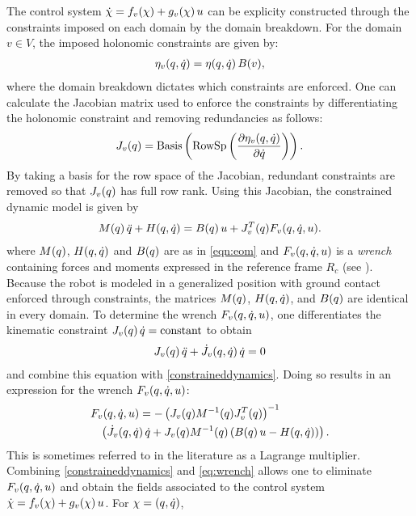 The control system ${\dot {\chi}} = f_v(\chi) + g_v(\chi) \, u$ can be explicity constructed through the constraints imposed on each domain by the domain breakdown.
%
For the domain $v \in V$, the imposed holonomic constraints are given by:
%
\begin{align}
  \eta_{v}(q, \dot{q}) = \eta(q, \dot{q}) \, B(v),
\end{align}
%
where the domain breakdown dictates which constraints are enforced.
%
One can calculate the Jacobian matrix used to enforce the constraints by differentiating the holonomic constraint and removing redundancies as follows:
%
\begin{align}
  J_{v}(q) = \mathrm{Basis}\left( \mathrm{RowSp}\left( \frac{\partial{\eta_{v}(q, \dot{q})}}{\partial{{\dot{q}}}} \right) \right).
\end{align}
%
By taking a basis for the row space of the Jacobian, redundant constraints are removed so that $J_v(q)$ has full row rank.
%
Using this Jacobian, the constrained dynamic model is given by
%
\begin{align}
  \label{constraineddynamics}
  M(q) \, \ddot{q} + H(q, \dot{q}) = B(q) \, u + J_v^T(q) F_v(q, \dot{q}, u).
\end{align}
%
where $M(q)$, $H(q, \dot{q})$ and $B(q)$ are as in \eqref{eqn:eom} and $F_v(q, \dot{q}, u)$ is a {\em wrench} containing forces and moments expressed in the reference frame $R_c$ (see \cite{Murray1994}).
%
Because the robot is modeled in a generalized position with ground contact enforced through constraints, the matrices $M(q)$, $H(q, \dot{q})$, and $B(q)$ are identical in every domain.
%
To determine the wrench $F_v(q, \dot{q}, u)$, one differentiates the kinematic constraint $J_v(q) \, \dot{q} = \mathrm{constant}$ to obtain
%
\begin{align}
  J_{v}(q) \, \ddot{q} + {\dot J}_{v}(q, \dot{q}) \, \dot{q} = 0
\end{align}
%
and combine this equation with \eqref{constraineddynamics}.
%
Doing so results in an expression for the wrench $F_v(q, \dot{q}, u)$:
%
\begin{align}
  \label{eq:wrench}
  \lefteqn{F_{v}\argsqdqu = -\left( J_{v}\argsq \M^{-1}\argsq J_{v}^{T}\argsq \right)^{-1} }\\
  \nonumber
  &&\left( {\dot J}_{v}\argsqdq \, \dq + J_{v}\argsq \M^{-1}\argsq \left( \B\argsq \, \u - \HCor\argsqdq \right) \right).
\end{align}
%
This is sometimes referred to in the literature as a Lagrange multiplier.
%
Combining \eqref{constraineddynamics} and \eqref{eq:wrench} allows one to eliminate $F_{v}(q, \dot{q}, u)$ and obtain the fields associated to the control system ${\dot {\chi}} = f_{v}(\chi) + g_{v}(\chi) \, u$. For $\chi = (q, \dot{q})$,
